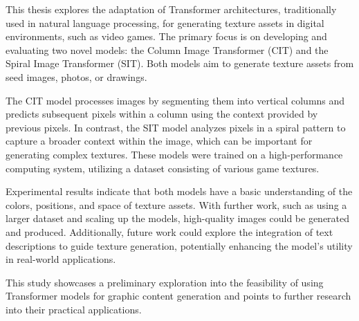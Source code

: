 This thesis explores the adaptation of Transformer architectures, traditionally used in natural language processing, for generating texture assets in digital environments, such as video games. The primary focus is on developing and evaluating two novel models: the Column Image Transformer (CIT) and the Spiral Image Transformer (SIT). Both models aim to generate texture assets from seed images, photos, or drawings.

The CIT model processes images by segmenting them into vertical columns and predicts subsequent pixels within a column using the context provided by previous pixels. In contrast, the SIT model analyzes pixels in a spiral pattern to capture a broader context within the image, which can be important for generating complex textures. These models were trained on a high-performance computing system, utilizing a dataset consisting of various game textures.

Experimental results indicate that both models have a basic understanding of the colors, positions, and space of texture assets. With further work, such as using a larger dataset and scaling up the models, high-quality images could be generated and produced. Additionally, future work could explore the integration of text descriptions to guide texture generation, potentially enhancing the model's utility in real-world applications.

This study showcases a preliminary exploration into the feasibility of using Transformer models for graphic content generation and points to further research into their practical applications.